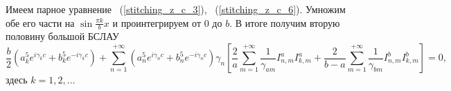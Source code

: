 Имеем парное уравнение ~(\ref{stitching_z_c_3}), ~(\ref{stitching_z_c_6}). Умножим обе его части на $\sin{\frac{\pi k}{b}x}$ и проинтегрируем от $0$ до $b$. В итоге получим вторую половину большой БСЛАУ
\begin{equation}
	\label{second_part}
	\frac{b}{2}\left(a_k^5e^{i\gamma_{k}c}+b_k^5e^{-i\gamma_{k}c}\right)+\sum\limits_{n=1}^{+\infty}\left(a_n^5e^{i\gamma_{n}c}+b_n^5e^{-i\gamma_{n}c}\right)\gamma_{n}\left[\frac{2}{a}\sum\limits_{m=1}^{+\infty}\frac{1}{\gamma_{am}}I_{n,m}^aI_{k,m}^a+\frac{2}{b-a}\sum\limits_{m=1}^{+\infty}\frac{1}{\gamma_{bm}}I_{n,m}^bI_{k,m}^b\right] = 0,
\end{equation}
здесь $k = 1, 2, \dots$
